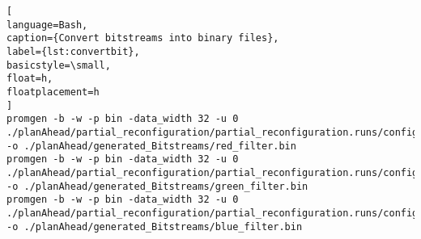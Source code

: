 \begin{lstlisting}[
language=Bash,
caption={Convert bitstreams into binary files},
label={lst:convertbit},
basicstyle=\small,
float=h,
floatplacement=h
]
promgen -b -w -p bin -data_width 32 -u 0 ./planAhead/partial_reconfiguration/partial_reconfiguration.runs/config_1/config_1_simple_filter_0_simple_filter_0_USER_LOGIC_I_filter_logic_0_red_filter_partial.bit -o ./planAhead/generated_Bitstreams/red_filter.bin
promgen -b -w -p bin -data_width 32 -u 0 ./planAhead/partial_reconfiguration/partial_reconfiguration.runs/config_2/config_2_simple_filter_0_simple_filter_0_USER_LOGIC_I_filter_logic_0_green_filter_partial.bit -o ./planAhead/generated_Bitstreams/green_filter.bin
promgen -b -w -p bin -data_width 32 -u 0 ./planAhead/partial_reconfiguration/partial_reconfiguration.runs/config_3/config_3_simple_filter_0_simple_filter_0_USER_LOGIC_I_filter_logic_0_blue_filter_partial.bit -o ./planAhead/generated_Bitstreams/blue_filter.bin
\end{lstlisting}
